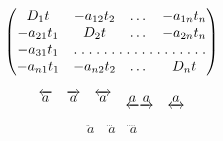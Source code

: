 \documentclass[11pt]{article}
\begin{document}
$$\begin{pmatrix}
D_1t & -a_{12}t_2 & \dots & -a_{1n}t_n \\
-a_{21}t_1 & D_2t & \dots & -a_{2n}t_n \\
-a_{31}t_1 & \hdotsfor[1.5]{3} \\
-a_{n1}t_1 & -a_{n2}t_2 & \dots & D_nt
\end{pmatrix}$$

$$\overleftarrow{a} \quad \overrightarrow{a} \quad \overleftrightarrow{a} \quad \underleftarrow{a} \underrightarrow{a} \quad \underleftrightarrow{a}$$

$$\ddot a \quad \dddot a \quad \ddddot a$$
\end{document}
